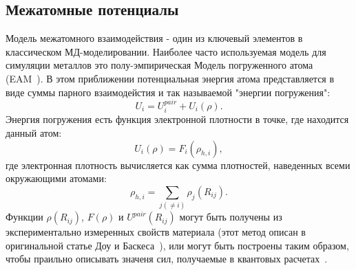 \documentclass[master,14pt,subf,href,colorlinks=true
]{disser}
\begin{document}
\subsection{Межатомные потенциалы}\label{chapter_potentials}
Модель межатомного взаимодействия - один из ключевый элементов в классическом МД-моделировании. Наиболее часто используемая модель для симуляции металлов это полу-эмпирическая Модель погруженного атома (EAM~\cite{EAM_original}). В этом приближении потенциальная энергия атома представляется в виде суммы парного взаимодейстия и так называемой "энергии погружения":
\begin{equation}
U_{i} = U_{i}^{pair} + U_{i}(\rho).
\end{equation}
\noindent Энергия погружения есть функция электронной плотности в точке, где находится данный атом:
\begin{equation}
U_{i}(\rho) = F_i(\rho_{h,i}),
\end{equation}
где электронная плотность вычисляется как сумма плотностей, наведенных всеми окружающими атомами:
\begin{equation}
\rho_{h,i} = \sum_{j (\neq i)} \rho_j(R_{ij}).
\end{equation}
Функции $\rho(R_{ij})$, $F(\rho)$ и $U^{pair}(R_{ij})$ могут быть получены из экспериментально измеренных свойств материала (этот метод описан в оригинальной статье Доу и Баскеса~\cite{EAM_original}), или могут быть построены таким образом, чтобы праильно описывать значеня сил, получаемые в квантовых расчетах~\cite{Potfit2015}.
\end{document}
